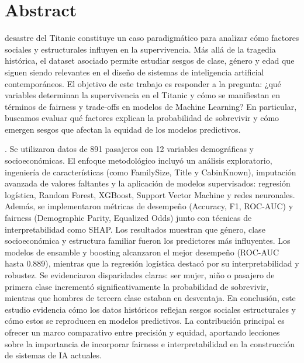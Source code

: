 \documentclass[sjournal]{IEEEtran}
\begin{document}
\section{Abstract}
 desastre del Titanic constituye un caso paradigmático para analizar cómo factores sociales y estructurales influyen en la supervivencia. Más allá de la tragedia histórica, el dataset asociado permite estudiar sesgos de clase, género y edad que siguen siendo relevantes en el diseño de sistemas de inteligencia artificial contemporáneos. El objetivo de este trabajo es responder a la pregunta: ¿qué variables determinan la supervivencia en el Titanic y cómo se manifiestan en términos de fairness y trade-offs en modelos de Machine Learning? En particular, buscamos evaluar qué factores explican la probabilidad de sobrevivir y cómo emergen sesgos que afectan la equidad de los modelos predictivos.


 \cite{weiss1999multiagent}.
Se utilizaron datos de 891 pasajeros con 12 variables demográficas y socioeconómicas. El enfoque metodológico incluyó un análisis exploratorio, ingeniería de características (como FamilySize, Title y CabinKnown), imputación avanzada de valores faltantes y la aplicación de modelos supervisados: regresión logística, Random Forest, XGBoost, Support Vector Machine y redes neuronales. Además, se implementaron métricas de desempeño (Accuracy, F1, ROC-AUC) y fairness (Demographic Parity, Equalized Odds) junto con técnicas de interpretabilidad como SHAP.
Los resultados muestran que género, clase socioeconómica y estructura familiar fueron los predictores más influyentes. Los modelos de ensamble y boosting alcanzaron el mejor desempeño (ROC-AUC hasta 0.889), mientras que la regresión logística destacó por su interpretabilidad y robustez. Se evidenciaron disparidades claras: ser mujer, niño o pasajero de primera clase incrementó significativamente la probabilidad de sobrevivir, mientras que hombres de tercera clase estaban en desventaja.
En conclusión, este estudio evidencia cómo los datos históricos reflejan sesgos sociales estructurales y cómo estos se reproducen en modelos predictivos. La contribución principal es ofrecer un marco comparativo entre precisión y equidad, aportando lecciones sobre la importancia de incorporar fairness e interpretabilidad en la construcción de sistemas de IA actuales.
\end{document}
